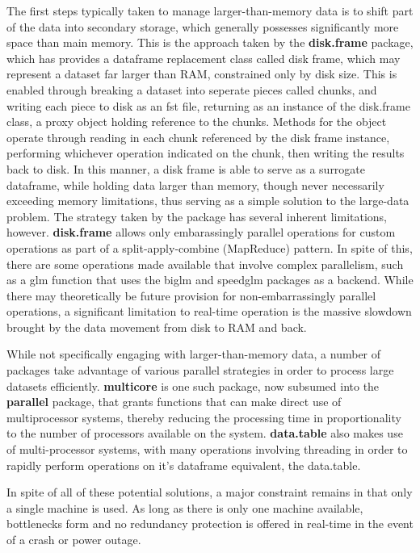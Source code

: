 \documentclass[a4paper,10pt]{article}
\begin{document}
The first steps typically taken to manage larger-than-memory data is to shift
part of the data into secondary storage, which generally possesses
significantly more space than main memory.
This is the approach taken by the \textbf{disk.frame} package, which has provides a dataframe replacement class called disk frame, which may represent a dataset far larger than RAM, constrained only by disk size\cite{zj20}.
This is enabled through breaking a dataset into seperate pieces called chunks, and writing each piece to disk as an fst file, returning as an instance of the disk.frame class, a proxy object holding reference to the chunks.
Methods for the object operate through reading in each chunk referenced by the disk frame instance, performing whichever operation indicated on the chunk, then writing the results back to disk. In this manner, a disk frame is able to serve as a surrogate dataframe, while holding data larger than memory, though never necessarily exceeding memory limitations, thus serving as a simple solution to the large-data problem.
The strategy taken by the package has several inherent limitations, however.
\textbf{disk.frame} allows only embarassingly parallel operations for custom operations as part of a split-apply-combine (MapReduce) pattern. In spite of this, there are some operations made available that involve complex parallelism, such as a glm function that uses the biglm and speedglm packages as a backend.
While there may theoretically be future provision for non-embarrassingly parallel operations, a significant limitation to real-time operation is the massive slowdown brought by the data movement from disk to RAM and back.

While not specifically engaging with larger-than-memory data, a number of packages take advantage of various parallel strategies in order to process large datasets efficiently.
\textbf{multicore} is one such package, now subsumed into the \textbf{parallel} package, that grants functions that can make direct use of multiprocessor systems, thereby reducing the processing time in proportionality to the number of processors available on the system.
\textbf{data.table} also makes use of multi-processor systems, with many operations involving threading in order to rapidly perform operations on it's dataframe equivalent, the data.table.

In spite of all of these potential solutions, a major constraint remains in that only a single machine is used.
As long as there is only one machine available, bottlenecks form and no redundancy protection is offered in real-time in the event of a crash or power outage.
\end{document}
